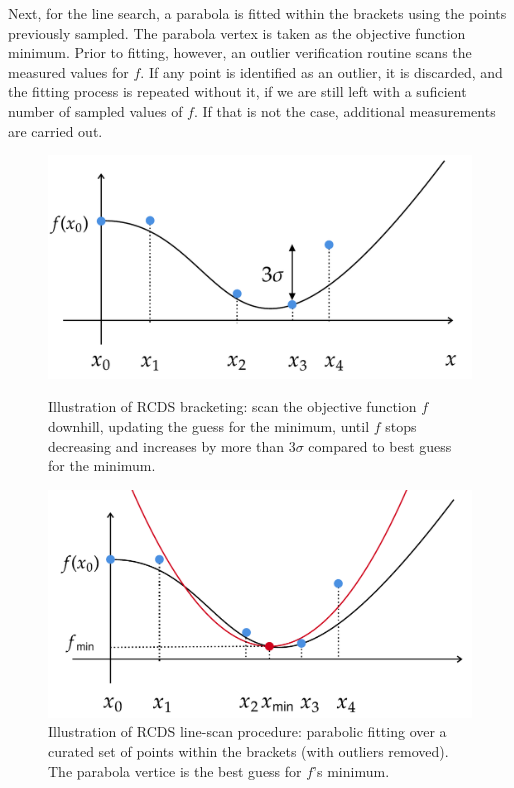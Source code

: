 Next, for the line search, a parabola is fitted within the brackets using the points previously sampled. The parabola vertex is taken as the objective function minimum. Prior to fitting, however, an outlier verification routine scans the measured values for $f$. If any point is identified as an outlier, it is discarded, and the fitting process is repeated without it, if we are still left with a suficient number of sampled values of $f$. If that is not the case, additional measurements are carried out.

\begin{figure}
    \begin{minipage}{0.48\textwidth}
        \centering
        \includegraphics[width=\textwidth]{Images/bracketing.pdf}
        \caption{Illustration of RCDS bracketing: scan the objective function $f$ downhill, updating the guess for the minimum, until $f$ stops decreasing and increases by more than $3\sigma$ compared to best guess for the minimum.}
        \label{fig:bracketing}
    \end{minipage}
    \hfill
    \begin{minipage}{0.48\textwidth}
        \centering
        \includegraphics[width=\textwidth]{Images/linescan.pdf}
        \caption{Illustration of RCDS line-scan procedure: parabolic fitting over a curated set of points within the brackets (with outliers removed). The parabola vertice is the best guess for $f$'s minimum.}
    \end{minipage}
\end{figure}
